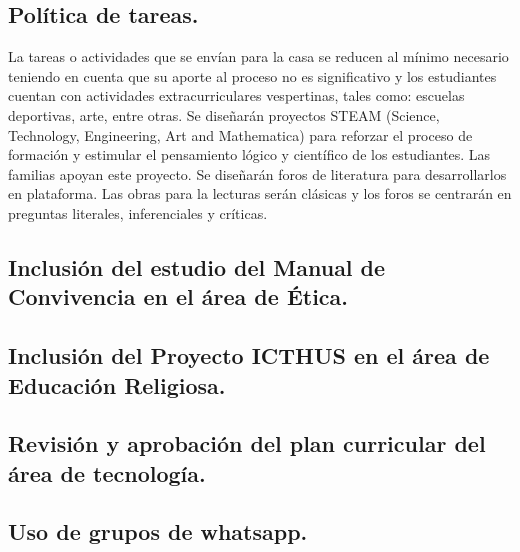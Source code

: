 \documentclass[12pt, letterpaper, twoside]{article}
\begin{document}
\subsection{Política de tareas.} La tareas o actividades que se envían para la casa se reducen al mínimo necesario teniendo en cuenta que su aporte al proceso no es significativo y los estudiantes cuentan con actividades extracurriculares vespertinas, tales como: escuelas deportivas, arte, entre otras.
Se diseñarán proyectos STEAM (Science, Technology, Engineering, Art and Mathematica) para reforzar el proceso de formación y estimular el pensamiento lógico y científico de los estudiantes. Las familias apoyan este proyecto.
Se diseñarán foros de literatura para desarrollarlos en plataforma. Las obras para la lecturas serán clásicas y los foros se centrarán en preguntas literales, inferenciales y críticas.

\subsection{Inclusión del estudio del Manual de Convivencia en el área de Ética.} 
\subsection{Inclusión del Proyecto ICTHUS en el área de Educación Religiosa.} 
\subsection{Revisión y aprobación del plan curricular del área de tecnología.} 
\subsection{Uso de grupos de whatsapp.} 

\end{document}
